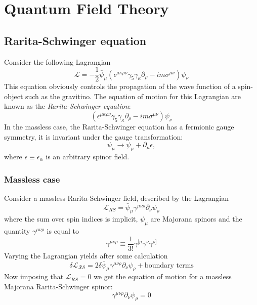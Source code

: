 \chapter{Quantum Field Theory}
\adjustmtc
\minitoc

\section{Rarita-Schwinger equation}
Consider the following Lagrangian
\begin{equation}
  \mathcal{L} = -\frac{1}{2}\bar{\psi}_\mu\left(\epsilon^{\mu\kappa\rho\nu}\gamma_5\gamma_\kappa\partial_\rho-im\sigma^{\mu\nu}\right)\psi_\nu
\end{equation}
This equation obviously controls the propagation of the wave function of
a spin- object such as the gravitino. The equation of motion for
this Lagrangian are known as the \textit{Rarita-Schwinger equation}:
\begin{equation}
\left(\epsilon^{\mu\kappa\rho\nu}\gamma_5\gamma_\kappa\partial_\rho
  -im\sigma^{\mu\nu}\right)\psi_\nu
\end{equation}
In the massless case, the Rarita-Schwinger equation has a fermionic gauge
symmetry, it is invariant under the gauge transformation:
\begin{equation}
  \psi_\mu\rightarrow\psi_\mu + \partial_\mu\epsilon,
\end{equation}
where $\epsilon\equiv\epsilon_\alpha$ is an arbitrary spinor field. 
\subsection{Massless case}
Consider a massless Rarita-Schwinger field, described by the Lagrangian
\begin{equation}
  \mathcal{L}_{RS} = \bar{\psi}_\mu\gamma^{\mu\nu\rho}\partial_\nu\psi_{\rho}
\end{equation}
where the sum over spin indices is implicit, $\psi_\mu$ are Majorana spinors
and the quantity $\gamma^{\mu\nu\rho}$ is equal to
\begin{equation}
  \gamma^{\mu\nu\rho}\equiv\frac{1}{3!}\gamma^{[\mu}\gamma^\nu\gamma^{\rho]}
\end{equation}
Varying the Lagrangian yields after some calculation
\begin{equation}
  \delta\mathcal{L_{RS}}
  = 2\delta\bar{\psi}_\mu\gamma^{\mu\nu\rho}\partial_\nu\psi_\rho
  + \text{boundary terms}
\end{equation}
Now imposing that $\mathcal{L}_{RS} =0$ we get the equation of motion for
a massless Majorana Rarita-Schwinger spinor:
\begin{equation}
  \gamma^{\mu\nu\rho}\partial_\nu\psi_\rho = 0
\end{equation}
